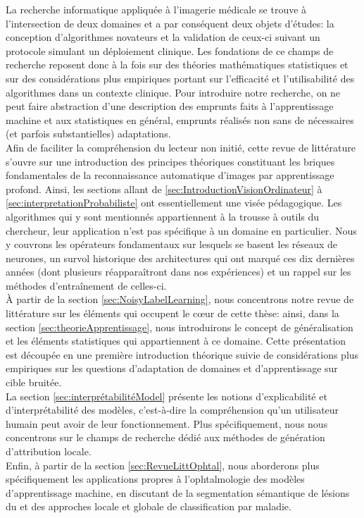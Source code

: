 \label{sec:RevLitt}




La recherche informatique appliquée à l'imagerie médicale se trouve à l'intersection de deux domaines et a par conséquent deux objets d'études: la conception d'algorithmes novateurs et la validation de ceux-ci suivant un protocole simulant un déploiement clinique. Les fondations de ce champs de recherche reposent donc à la fois sur des théories mathématiques statistiques et sur des considérations plus empiriques portant sur l'efficacité et l'utilisabilité des algorithmes dans un contexte clinique. Pour introduire notre recherche, on ne peut faire abstraction d'une description des emprunts faits à l'apprentissage machine et aux statistiques en général, emprunts réalisés non sans de nécessaires (et parfois substantielles) adaptations. \\
Afin de faciliter la compréhension du lecteur non initié, cette revue de littérature s'ouvre sur une introduction des principes théoriques constituant les briques fondamentales de la reconnaissance automatique d'images par apprentissage profond. Ainsi, les sections allant de \ref{sec:IntroductionVisionOrdinateur} à \ref{sec:interpretationProbabiliste} ont essentiellement une visée pédagogique. Les algorithmes qui y sont mentionnés appartiennent à la trousse à outils du chercheur, leur application n'est pas spécifique à un domaine en particulier. Nous y couvrons les opérateurs fondamentaux sur lesquels se basent les réseaux de neurones, un survol historique des architectures qui ont marqué ces dix dernières années (dont plusieurs réapparaîtront dans nos expériences) et un rappel sur les méthodes d'entraînement de celles-ci.
\\
À partir de la section \ref{sec:NoisyLabelLearning}, nous concentrons notre revue de littérature sur les éléments qui occupent le cœur de cette thèse: ainsi, dans la  section \ref{sec:theorieApprentissage}, nous introduirons le concept de généralisation et les éléments statistiques qui appartiennent à ce domaine. Cette présentation est découpée en une première introduction théorique suivie de considérations plus empiriques sur les questions d'adaptation de domaines et d'apprentissage sur cible bruitée. 
\\
La section \ref{sec:interprétabilitéModel} présente les notions d'explicabilité et d'interprétabilité des modèles, c'est-à-dire la compréhension qu'un utilisateur humain peut avoir de leur fonctionnement. Plus spécifiquement, nous nous concentrons sur le champs de recherche dédié aux méthodes de génération d'attribution locale.
\\
Enfin, à partir de la section \ref{sec:RevueLittOphtal}, nous aborderons plus spécifiquement les applications propres à l'ophtalmologie des modèles d'apprentissage machine, en discutant de la segmentation sémantique de lésions du \fundus{} et des approches locale et globale de classification par maladie.
